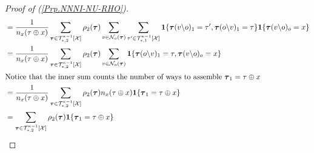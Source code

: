 \documentclass[12pt]{article}
\newcommand{\TB}{{ \boldsymbol\tau}}
\newcommand{\BS}{\backslash}
\newcommand{\X}{{\mathcal{X}}}
\newcommand{\TT}{{\mathcal{T}}}
\newcommand{\one}[1]{\mathbf{1}\{#1\}}
\newcommand{\tree}[2]{\TT_{*, #1}^{#2}[\X]}
\newcommand{\cnt}[1]{{n_{#1}}}
\newcommand{\Sl}{{\rho_2}}
\newcommand{\NB}[1]{{\mathcal{N}_o(#1)}}
\numberwithin{equation}{section}
\begin{document}
\begin{proof}[Proof of (\ref{Prp.NNNI-NU-RHO})]
\begin{align*}
                             & = \frac{1}{\cnt{x}(\tau\oplus x)}\sum_{\TB\in\tree{2}{\kappa-1}}\Sl(\TB)\sum_{v\in\NB{\TB}}\sum_{\tau'\in\tree{1}{\kappa-1}}\one{\TB(v\BS o)_1=\tau', \TB(o\BS v)_1=\tau}\one{\TB(v\BS o)_o=x}      \\
                             & = \frac{1}{\cnt{x}(\tau\oplus x)}\sum_{\TB\in\tree{2}{\kappa-1}}\Sl(\TB)\sum_{v\in\NB{\TB}}\one{\TB(o\BS v)_1=\tau, \TB(v\BS o)_o=x}                                                                \\
        \intertext{Notice that the inner sum counts the number of ways to assemble $\TB_1=\tau\oplus x$}
                             & = \frac{1}{\cnt{x}(\tau\oplus x)}\sum_{\TB\in\tree{2}{\kappa-1}}\Sl(\TB)\cnt{x}(\tau\oplus x)\one{\TB_1=\tau\oplus x}                                                                               \\
                             & = \sum_{\TB\in\tree{2}{\kappa-1}}\Sl(\TB)\one{\TB_1=\tau\oplus x}
    \end{align*}
\end{proof}

\newpage
\end{document}
